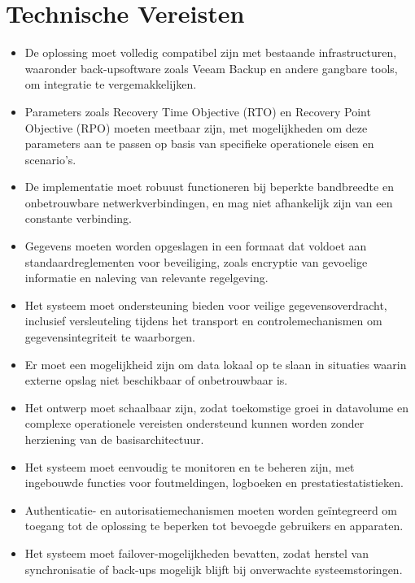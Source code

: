     \section{Technische Vereisten}
    \begin{itemize}
    \item De oplossing moet volledig compatibel zijn met bestaande infrastructuren, waaronder back-upsoftware zoals Veeam Backup en andere gangbare tools, om integratie te vergemakkelijken.
    \item Parameters zoals Recovery Time Objective (RTO) en Recovery Point Objective (RPO) moeten meetbaar zijn, met mogelijkheden om deze parameters aan te passen op basis van specifieke operationele eisen en scenario's.
    \item De implementatie moet robuust functioneren bij beperkte bandbreedte en onbetrouwbare netwerkverbindingen, en mag niet afhankelijk zijn van een constante verbinding.
    \item Gegevens moeten worden opgeslagen in een formaat dat voldoet aan standaardreglementen voor beveiliging, zoals encryptie van gevoelige informatie en naleving van relevante regelgeving.
    \item Het systeem moet ondersteuning bieden voor veilige gegevensoverdracht, inclusief versleuteling tijdens het transport en controlemechanismen om gegevensintegriteit te waarborgen.
    \item Er moet een mogelijkheid zijn om data lokaal op te slaan in situaties waarin externe opslag niet beschikbaar of onbetrouwbaar is.
    \item Het ontwerp moet schaalbaar zijn, zodat toekomstige groei in datavolume en complexe operationele vereisten ondersteund kunnen worden zonder herziening van de basisarchitectuur.
    \item Het systeem moet eenvoudig te monitoren en te beheren zijn, met ingebouwde functies voor foutmeldingen, logboeken en prestatiestatistieken.
    \item Authenticatie- en autorisatiemechanismen moeten worden geïntegreerd om toegang tot de oplossing te beperken tot bevoegde gebruikers en apparaten.
    \item Het systeem moet failover-mogelijkheden bevatten, zodat herstel van synchronisatie of back-ups mogelijk blijft bij onverwachte systeemstoringen.
    \end{itemize}

    
